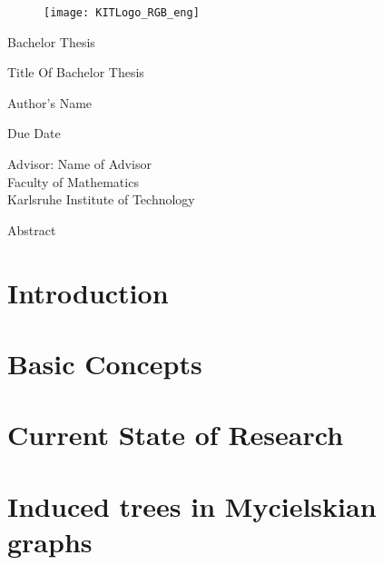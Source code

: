 \documentclass[12pt,a4paper]{scrartcl}
\theoremstyle{plain}
\theoremstyle{definition}
\numberwithin{equation}{section}
\begin{document}
  \pagestyle{empty}

  \begin{titlepage}

\begin{figure}[h]
\texttt{[image: KITLogo\_RGB\_eng]} 
\end{figure}
  
    \vspace*{2cm} 

 \begin{center} \large 
    
    Bachelor Thesis
    \vspace*{2cm}

    {\huge Title Of Bachelor Thesis}
    \vspace*{2.5cm}

    Author's Name
    \vspace*{1.5cm}

    Due Date
    \vspace*{4.5cm}


    Advisor: Name of Advisor \\[1cm]
    Faculty of Mathematics \\[1cm]
		Karlsruhe Institute of Technology
  \end{center}
\end{titlepage}

Abstract
\newpage
  \tableofcontents

\newpage
 


  \pagestyle{headings}

\section{Introduction}

\newpage
\section{Basic Concepts}

\newpage 
\section{Current State of Research}


\newpage
\section{Induced trees in Mycielskian graphs}

  \newpage
\end{document}

